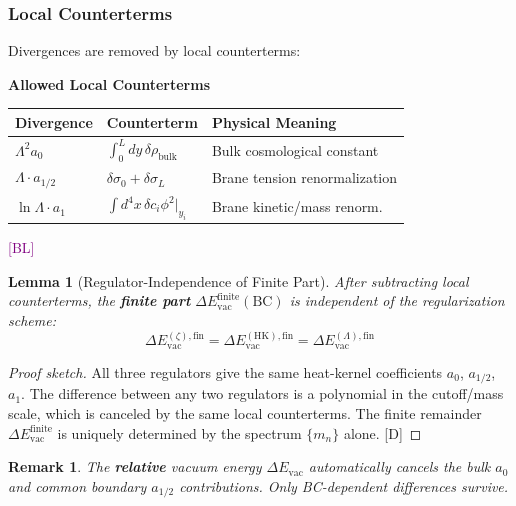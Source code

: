 \documentclass[11pt,a4paper]{article}
\newtheorem{lemma}[theorem]{Lemma}
\newtheorem{remark}[theorem]{Remark}
\newcommand{\tagD}{\textcolor{blue!70!black}{[D]}}
\newcommand{\tagBL}{\textcolor{purple}{[BL]}}
\begin{document}
\subsubsection{Local Counterterms}

Divergences are removed by local counterterms:

\begin{selectorbox}
\textbf{Allowed Local Counterterms}

\begin{center}
\begin{tabular}{lll}
\toprule
\textbf{Divergence} & \textbf{Counterterm} & \textbf{Physical Meaning} \\
\midrule
$\Lambda^2 a_0$ & $\int_0^L dy\, \delta\rho_{\text{bulk}}$ & Bulk cosmological constant \\
$\Lambda \cdot a_{1/2}$ & $\delta\sigma_0 + \delta\sigma_L$ & Brane tension renormalization \\
$\ln\Lambda \cdot a_1$ & $\int d^4x\, \delta c_i \phi^2|_{y_i}$ & Brane kinetic/mass renorm. \\
\bottomrule
\end{tabular}
\end{center}
\tagBL
\end{selectorbox}

\begin{lemma}[Regulator-Independence of Finite Part]
\label{lem:regulator-inv}
After subtracting local counterterms, the \textbf{finite part}
$\Delta E_{\text{vac}}^{\text{finite}}(\text{BC})$ is independent of the regularization scheme:
\begin{equation}
\label{eq:finite-invariance}
\Delta E_{\text{vac}}^{(\zeta),\text{fin}} = \Delta E_{\text{vac}}^{(\text{HK}),\text{fin}}
= \Delta E_{\text{vac}}^{(\Lambda),\text{fin}}
\end{equation}
\end{lemma}

\begin{proof}[Proof sketch]
All three regulators give the same heat-kernel coefficients $a_0$, $a_{1/2}$, $a_1$.
The difference between any two regulators is a polynomial in the cutoff/mass scale,
which is canceled by the same local counterterms. The finite remainder
$\Delta E_{\text{vac}}^{\text{finite}}$ is uniquely determined by the spectrum $\{m_n\}$
alone. \tagD
\end{proof}

\begin{remark}
The \textbf{relative} vacuum energy $\Delta E_{\text{vac}}$ automatically cancels
the bulk $a_0$ and common boundary $a_{1/2}$ contributions. Only BC-dependent
differences survive.
\end{remark}
\end{document}
